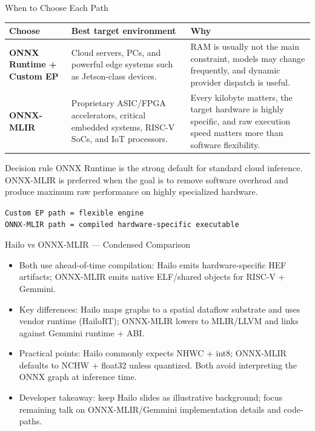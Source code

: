\documentclass[aspectratio=169,10pt]{beamer}
\newcommand{\code}[1]{\texttt{\footnotesize #1}}
\newcommand{\edgeword}[1]{\textcolor{red!75!black}{\textbf{#1}}}
\begin{document}
\begin{frame}{When to Choose Each Path}
  \scriptsize
  \begin{tabularx}{\textwidth}{@{}lXX@{}}
    \toprule
    Choose & Best target environment & Why \\
    \midrule
    \edgeword{ONNX Runtime + Custom EP} &
      Cloud servers, PCs, and powerful edge systems such as Jetson-class devices. &
      RAM is usually not the main constraint, models may change frequently, and dynamic provider dispatch is useful. \\
    \edgeword{ONNX-MLIR} &
      Proprietary ASIC/FPGA accelerators, critical embedded systems, RISC-V SoCs, and IoT processors. &
      Every kilobyte matters, the target hardware is highly specific, and raw execution speed matters more than software flexibility. \\
    \bottomrule
  \end{tabularx}

  \vspace{0.55em}
  \begin{block}{Decision rule}
    ONNX Runtime is the strong default for standard cloud inference. ONNX-MLIR is preferred when the goal is to remove software overhead and produce maximum raw performance on highly specialized hardware.
  \end{block}

  \vspace{0.35em}
  \begin{center}
    \code{Custom EP path = flexible engine}\\
    \code{ONNX-MLIR path = compiled hardware-specific executable}
  \end{center}
\end{frame}

\begin{frame}{Hailo vs ONNX-MLIR — Condensed Comparison}
  \scriptsize
  \begin{itemize}
    \item Both use ahead-of-time compilation: Hailo emits hardware-specific HEF artifacts; ONNX-MLIR emits native ELF/shared objects for RISC-V + Gemmini.
    \item Key differences: Hailo maps graphs to a spatial dataflow substrate and uses vendor runtime (HailoRT); ONNX-MLIR lowers to MLIR/LLVM and links against Gemmini runtime + ABI.
    \item Practical points: Hailo commonly expects NHWC + int8; ONNX-MLIR defaults to NCHW + float32 unless quantized. Both avoid interpreting the ONNX graph at inference time.
    \item Developer takeaway: keep Hailo slides as illustrative background; focus remaining talk on ONNX-MLIR/Gemmini implementation details and code-paths.
  \end{itemize}
\end{frame}
\end{document}
